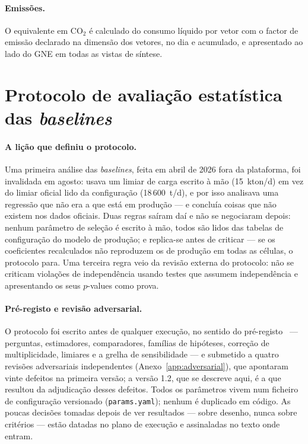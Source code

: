 \paragraph{Emissões.} O equivalente em CO$_2$ é calculado do consumo
líquido por vetor com o factor de emissão declarado na dimensão dos
vetores, no dia e acumulado, e apresentado ao lado do GNE em todas as
vistas de síntese.

\section{Protocolo de avaliação estatística das \emph{baselines}}
\label{sec:protocolo-baselines}

\paragraph{A lição que definiu o protocolo.} Uma primeira análise das
\emph{baselines}, feita em abril de 2026 fora da plataforma, foi
invalidada em agosto: usava um limiar de carga escrito à mão (15~kton/d)
em vez do limiar oficial lido da configuração (18\,600~t/d), e por isso
analisava uma regressão que não era a que está em produção --- e concluía
coisas que não existem nos dados oficiais. Duas regras saíram daí e não
se negociaram depois: nenhum parâmetro de seleção é escrito à mão, todos
são lidos das tabelas de configuração do modelo de produção; e replica-se
antes de criticar --- se os coeficientes recalculados não reproduzem os de
produção em todas as células, o protocolo para. Uma terceira regra veio da
revisão externa do protocolo: não se criticam violações de independência
usando testes que assumem independência e apresentando os seus
$p$-values como prova.

\paragraph{Pré-registo e revisão adversarial.} O protocolo foi escrito
antes de qualquer execução, no sentido do pré-registo~\cite{Nosek2018} --- perguntas, estimadores, comparadores,
famílias de hipóteses, correção de multiplicidade, limiares e a grelha de
sensibilidade --- e submetido a quatro revisões adversariais independentes
(Anexo~\ref{app:adversarial}), que apontaram vinte defeitos na primeira
versão; a versão 1.2, que se descreve aqui, é a que resultou da
adjudicação desses defeitos. Todos os parâmetros vivem num ficheiro de
configuração versionado (\texttt{params.yaml}); nenhum é duplicado em
código. As poucas decisões tomadas depois de ver resultados --- sobre desenho,
nunca sobre critérios --- estão datadas no plano de execução e assinaladas
no texto onde entram.

